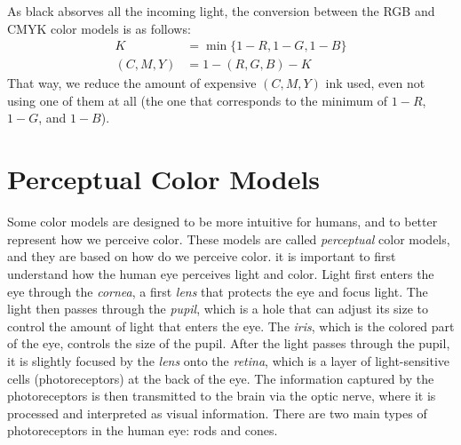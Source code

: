 As black absorves all the incoming light, the conversion between the RGB and CMYK color models is as follows:
\begin{align*}
    K &= \min\{1-R, 1-G, 1-B\} \\
    (C, M, Y) &= 1-(R, G, B) - K
\end{align*}
That way, we reduce the amount of expensive $(C, M, Y)$ ink used, even not using one of them at all (the one that corresponds to the minimum of $1-R$, $1-G$, and $1-B$).

\section{Perceptual Color Models}

Some color models are designed to be more intuitive for humans, and to better represent how we perceive color. These models are called \emph{perceptual} color models, and they are based on how do we perceive color. it is important to first understand how the human eye perceives light and color. Light first enters the eye through the \emph{cornea}, a first \emph{lens} that protects the eye and focus light. The light then passes through the \emph{pupil}, which is a hole that can adjust its size to control the amount of light that enters the eye. The \emph{iris}, which is the colored part of the eye, controls the size of the pupil. After the light passes through the pupil, it is slightly focused by the \emph{lens} onto the \emph{retina}, which is a layer of light-sensitive cells (photoreceptors) at the back of the eye. The information captured by the photoreceptors is then transmitted to the brain via the optic nerve, where it is processed and interpreted as visual information.
There are two main types of photoreceptors in the human eye: rods and cones.
